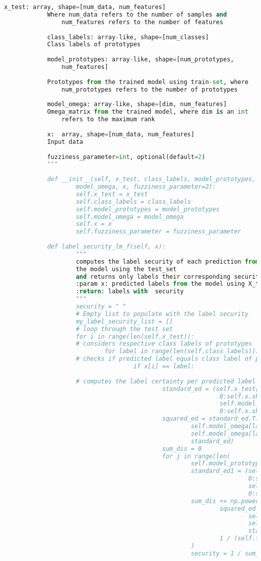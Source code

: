 \documentclass[english]{HSMW-Thesis}
\begin{document}
\begin{lstlisting}[caption=label\textunderscore security1.py ,style=chstyle, language=Python]
			x_test: array, shape=[num_data, num_features]
			Where num_data refers to the number of samples and 
				num_features refers to the number of features
	
			class_labels: array-like, shape=[num_classes]
			Class labels of prototypes
	
			model_prototypes: array-like, shape=[num_prototypes,
				num_features]
	
			Prototypes from the trained model using train-set, where
				num_prototypes refers to the number of prototypes
	
			model_omega: array-like, shape=[dim, num_features]
			Omega_matrix from the trained model, where dim is an int 
				refers to the maximum rank
			
			x:  array, shape=[num_data, num_features]
			Input data
	
			fuzziness_parameter=int, optional(default=2)
			"""
	
			def __init__(self, x_test, class_labels, model_prototypes,
				 	model_omega, x, fuzziness_parameter=2):
					self.x_test = x_test
					self.class_labels = class_labels
					self.model_prototypes = model_prototypes
					self.model_omega = model_omega
					self.x = x
					self.fuzziness_parameter = fuzziness_parameter
	
			def label_security_lm_f(self, x):
					"""
					computes the label security of each prediction from
					the model using the test_set
					and returns only labels their corresponding security.
					:param x: predicted labels from the model using X_test
					:return: labels with  security
					"""
					security = " "
					# Empty list to populate with the label security
					my_label_security_list = []
					# loop through the test set
					for i in range(len(self.x_test)):
					# considers respective class labels of prototypes
							for label in range(len(self.class_labels)):
					# checks if predicted label equals class label of prototypes
									if x[i] == label:
			
					# computes the label certainty per predicted label
											standard_ed = (self.x_test[i,
															0:self.x.shape[1]]-
															self.model_prototypes[label,
															0:self.x.shape[1]])
											squared_ed = standard_ed.T.dot(
													self.model_omega[label].T).dot(
													self.model_omega[label]).dot(
													standard_ed)
											sum_dis = 0
											for j in range(len(
													self.model_prototypes)):
													standard_ed1 = (self.x_test[i,
																	0:self.x.shape[1]]-
																	self.model_prototypes[j,
																	0:self.x.shape[1]])
													sum_dis += np.power(
															squared_ed / (standard_ed1.T.dot(
																	self.model_omega[j].T).dot(
																	self.model_omega[j]).dot(
																	standard_ed1)),
															1 / (self.fuzziness_parameter - 1)
													)
													security = 1 / sum_dis
	

\end{lstlisting}
\end{document}
